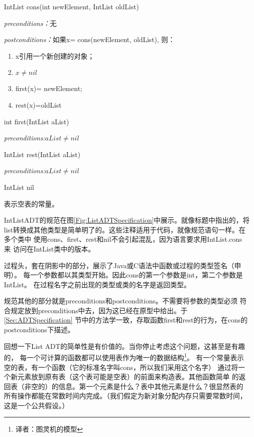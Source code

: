 \begin{figure*}[!t]
\colorbox[rgb]{0.9, 0.9, 0.9}{IntList cons(int newElement, IntList oldList)}

\emph{preconditions：}无

\emph{postconditions：}如果x= cons(newElement, oldList), 则：
\begin{enumerate}
\item x引用一个新创建的对象；
\item $x\neq nil$
\item first(x)= newElement;
\item rest(x)=oldList
\end{enumerate}

\colorbox[rgb]{0.9, 0.9, 0.9}{int first(IntList aList)}

\emph{preconditions:}$aList \neq nil$

\colorbox[rgb]{0.9, 0.9, 0.9}{IntList rest(IntList aList)}

\emph{preconditions:}$aList \neq nil$

\colorbox[rgb]{0.9, 0.9, 0.9}{IntList nil}

表示空表的常量。

    \caption{IntList ADT的规范。函数cons是构造函数；first和rest是存取函数。
    List ADT是类似的，只是所有的int替换成Object，所有的IntList替换成List。
    其他类型元素的转换类似。}
    \label{Fig:ListADTSpecification}
\end{figure*}

IntListADT的规范在图\ref{Fig:ListADTSpecification}中展示。就像标题中指出的，将
list转换成其他类型是简单明了的。这些注释适用于代码，就像规范语句一样。在多个类中
使用cons、first、rest和nil不会引起混乱，因为语言要求用IntList.cons 来
访问在IntList类中的版本。

过程头，套在阴影中的部分，展示了Java或C语法中函数或过程的类型签名（申明）。
每一个参数都以其类型开始。因此cons的第一个参数是int，第二个参数是IntList。
在过程名字之前出现的类型或类的名字是返回类型。

规范其他的部分就是preconditions和postconditions。不需要将参数的类型必须
符合规定放到preconditions中去，因为这已经在原型中给出。于\ref{Sec:ADTSpecification}
节中的方法学一致，存取函数first和rest的行为，在cons的postconditions下描述。

回想一下List ADT的简单性是有价值的。当你停止考虑这个问题，这甚至是有趣的，
每一个可计算的函数都可以使用表作为唯一的数据结构\footnote{译者：图灵机的模型}。
有一个常量表示空的表，有一个函数（它的标准名字叫cons，所以我们采用这个名字）
通过将一个新元素放到原有表（这个表可能是空表）的前面来构造表。其他函数简单
的返回表（非空的）的信息。第一个元素是什么？表中其他元素是什么？很显然表的
所有操作都能在常数时间内完成。（我们假定为新对象分配内存只需要常数时间，
这是一个公共假设。）

